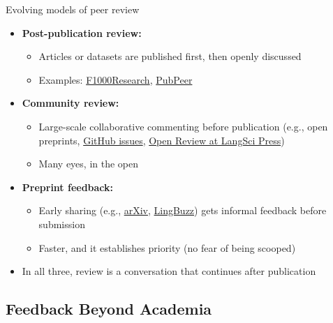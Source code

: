 \documentclass[aspectratio=169]{beamer}
\begin{document}
\begin{frame}{Evolving models of peer review}
\begin{itemize}

  \item \textbf{Post-publication review:}
    \begin{itemize}
      \item Articles or datasets are published first, then openly discussed
      \item Examples:
        \href{https://f1000research.com/}{F1000Research},
        \href{https://pubpeer.com/}{PubPeer}
    \end{itemize}

  \item \textbf{Community review:}
    \begin{itemize}
      \item Large-scale collaborative commenting before publication
            (e.g., open preprints, \href{https://github.com/}{GitHub issues}, \href{https://langsci-press.org/openReview/intro}{Open Review at LangSci Press})
      \item Many eyes, in the open
    \end{itemize}

  \item \textbf{Preprint feedback:}
    \begin{itemize}
      \item Early sharing (e.g., \href{https://arxiv.org/}{arXiv},
            \href{https://ling.auf.net/lingbuzz}{LingBuzz}) gets informal feedback before submission
      \item Faster, and it establishes priority (no fear of being scooped)
    \end{itemize}

  \item In all three, review is a conversation that continues after publication
\end{itemize}

\end{frame}


\subsection{Feedback Beyond Academia}
\end{document}

